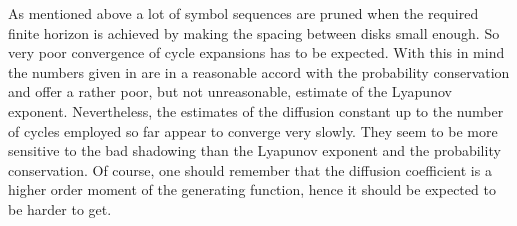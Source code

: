 {As mentioned above a lot of symbol sequences are pruned when the
required finite horizon is achieved by making the spacing between
disks small enough. So very poor convergence of cycle expansions has
to be expected. With this in mind the numbers given in
 are in a reasonable accord with the probability
conservation and offer a rather poor, but not unreasonable, estimate
of the Lyapunov exponent.
Nevertheless, the estimates of the diffusion constant up to the number
of cycles employed so far appear to converge very slowly. They seem to
be more sensitive to the bad shadowing than the Lyapunov exponent and
the probability conservation. Of course, one should remember that the
diffusion coefficient is a higher order moment of the generating
function, hence it should be expected to be harder to get.
%
%
%
%

}
